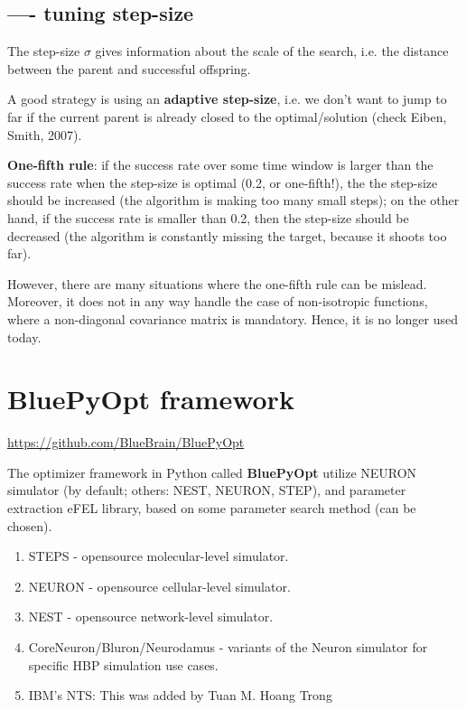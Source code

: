 \subsection{---- tuning step-size}
\label{sec:EA-Gaussian-mutation-step-size-tuning}

The step-size $\sigma$ gives information about the scale of the search, i.e.
the distance between the parent and successful offspring.

A good strategy is using an {\bf adaptive step-size}, i.e. we don't want to jump
to far if the current parent is already closed to the optimal/solution (check
Eiben, Smith, 2007).

{\bf One-fifth rule}: if the success rate over some time window is larger than
the success rate when the step-size is optimal (0.2, or one-fifth!), the the
step-size should be increased (the algorithm is making too many small steps); on
the other hand, if the success rate is smaller than 0.2, then the step-size
should be decreased (the algorithm is constantly missing the target, because it
shoots too far).

However, there are many situations where the one-fifth rule can be mislead.
Moreover, it does not in any way handle the case of non-isotropic functions,
where a non-diagonal covariance matrix is mandatory. Hence, it is no longer
used today.








\section{BluePyOpt framework}
\label{sec:BluePyOpt}
\url{https://github.com/BlueBrain/BluePyOpt}


The optimizer framework in Python called {\bf BluePyOpt} utilize NEURON
simulator (by default; others: NEST, NEURON, STEP), and parameter extraction
eFEL library, based on some parameter search method (can be chosen).
\begin{enumerate}
  \item  STEPS - opensource molecular-level simulator.

  \item  NEURON - opensource cellular-level simulator.

  \item NEST - opensource network-level simulator.

  \item CoreNeuron/Bluron/Neurodamus - variants of the Neuron simulator for specific
  HBP simulation use cases.

   \item IBM's NTS: This was added by Tuan M. Hoang Trong  
\end{enumerate}

